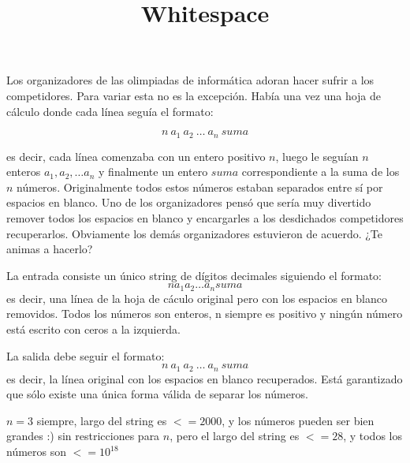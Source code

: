 \documentclass{oci}
\title{Whitespace}
\begin{document}
\begin{problemDescription}
Los organizadores de las olimpiadas de informática adoran hacer sufrir a los competidores. Para variar esta no es la excepción. Había una vez una hoja de cálculo donde cada línea seguía el formato:

$$n\ a_1\ a_2\ \dots\ a_n\ suma$$

es decir, cada línea comenzaba con un entero positivo $n$, luego le seguían $n$ enteros $a_1, a_2, \dots a_n$ y finalmente un entero $suma$ correspondiente a la suma de los $n$ números. Originalmente todos estos números estaban separados entre sí por espacios en blanco. Uno de los organizadores pensó que sería muy divertido remover todos los espacios en blanco y encargarles a los desdichados competidores recuperarlos. Obviamente los demás organizadores estuvieron de acuerdo. ¿Te animas a hacerlo?
\end{problemDescription}

\begin{inputDescription}
La entrada consiste un único string de dígitos decimales siguiendo el formato:
$$n a_1 a_2 \dots a_n suma$$
es decir, una línea de la hoja de cáculo original pero con los espacios en blanco removidos. Todos los números son enteros, n siempre es positivo y ningún número está escrito con ceros a la izquierda.
\end{inputDescription}

\begin{outputDescription}
La salida debe seguir el formato:
$$n\ a_1\ a_2\ \dots\ a_n\ suma$$
es decir, la línea original con los espacios en blanco recuperados. Está garantizado que sólo existe una única forma válida de separar los números.
\end{outputDescription}

\begin{scoreDescription}
   $n = 3$ siempre, largo del string es $<= 2000$, y los números pueden ser bien grandes :)
   sin restricciones para $n$, pero el largo del string es $<= 28$, y todos los números son $ <= 10^{18}$
\end{scoreDescription}

\begin{sampleDescription}
\end{sampleDescription}
\end{document}
